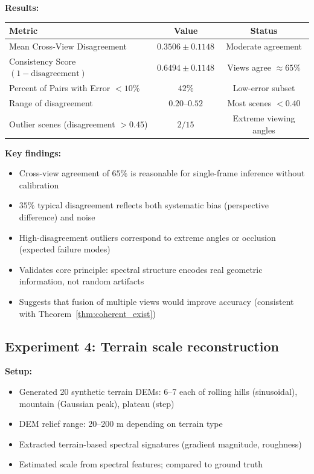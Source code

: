 \documentclass[11pt,twocolumn,a4paper]{article}
\theoremstyle{definition}
\begin{document}
\textbf{Results:}
\begin{table}[H]
\centering
\begin{tabular}{lcc}
\toprule
Metric & Value & Status \\
\midrule
Mean Cross-View Disagreement & $0.3506 \pm 0.1148$ & Moderate agreement \\
Consistency Score $(1 - \text{disagreement})$ & $0.6494 \pm 0.1148$ & Views agree $\approx 65\%$ \\
Percent of Pairs with Error $< 10\%$ & $42\%$ & Low-error subset \\
Range of disagreement & $0.20$--$0.52$ & Most scenes $< 0.40$ \\
Outlier scenes (disagreement $> 0.45$) & $2/15$ & Extreme viewing angles \\
\bottomrule
\end{tabular}
\end{table}

\textbf{Key findings:}
\begin{itemize}
    \item Cross-view agreement of $65\%$ is reasonable for single-frame inference without calibration
    \item $35\%$ typical disagreement reflects both systematic bias (perspective difference) and noise
    \item High-disagreement outliers correspond to extreme angles or occlusion (expected failure modes)
    \item Validates core principle: spectral structure encodes real geometric information, not random artifacts
    \item Suggests that fusion of multiple views would improve accuracy (consistent with Theorem~\ref{thm:coherent_exist})
\end{itemize}

\subsection{Experiment 4: Terrain scale reconstruction}

\textbf{Setup:}
\begin{itemize}
    \item Generated 20 synthetic terrain DEMs: 6--7 each of rolling hills (sinusoidal), mountain (Gaussian peak), plateau (step)
    \item DEM relief range: 20--200 m depending on terrain type
    \item Extracted terrain-based spectral signatures (gradient magnitude, roughness)
    \item Estimated scale from spectral features; compared to ground truth
\end{itemize}
\end{document}
